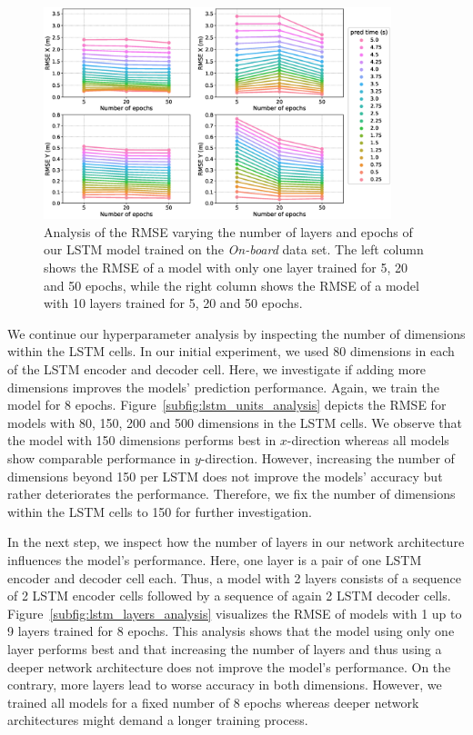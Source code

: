 \begin{figure}[t!]
  \centering
  \includegraphics[width=0.9\textwidth]{imgs/lstm_layers_epochs_analysis.eps}
  \caption{Analysis of the \ac{RMSE} varying the number of layers and epochs of our \ac{LSTM} model trained on the \emph{On-board} data set. The left column shows the \ac{RMSE} of a model with only one layer trained for \num{5}, \num{20} and \num{50} epochs, while the right column shows the \ac{RMSE} of a model with \num{10} layers trained for \num{5}, \num{20} and \num{50} epochs.}
  \label{fig:lstm_layers_epochs_analysis}
\end{figure}

We continue our hyperparameter analysis by inspecting the number of dimensions within the \ac{LSTM} cells.
In our initial experiment, we used \num{80} dimensions in each of the \ac{LSTM} encoder and decoder cell.
Here, we investigate if adding more dimensions improves the models' prediction performance.
Again, we train the model for \num{8} epochs.
Figure~\ref{subfig:lstm_units_analysis} depicts the \ac{RMSE} for models with \num{80}, \num{150}, \num{200} and \num{500} dimensions in the \ac{LSTM} cells.
We observe that the model with \num{150} dimensions performs best in $x$-direction whereas all models show comparable performance in $y$-direction.
However, increasing the number of dimensions beyond \num{150} per \ac{LSTM} does not improve the models' accuracy but rather deteriorates the performance.
Therefore, we fix the number of dimensions within the \ac{LSTM} cells to \num{150} for further investigation.

In the next step, we inspect how the number of layers in our network architecture influences the model's performance.
Here, one layer is a pair of one \ac{LSTM} encoder and decoder cell each.
Thus, a model with \num{2} layers consists of a sequence of \num{2} \ac{LSTM} encoder cells followed by a sequence of again \num{2} \ac{LSTM} decoder cells.
Figure~\ref{subfig:lstm_layers_analysis} visualizes the \ac{RMSE} of models with \num{1} up to \num{9} layers trained for \num{8} epochs.
This analysis shows that the model using only one layer performs best and that increasing the number of layers and thus using a deeper network architecture does not improve the model's performance.
On the contrary, more layers lead to worse accuracy in both dimensions.
However, we trained all models for a fixed number of \num{8} epochs whereas deeper network architectures might demand a longer training process.

